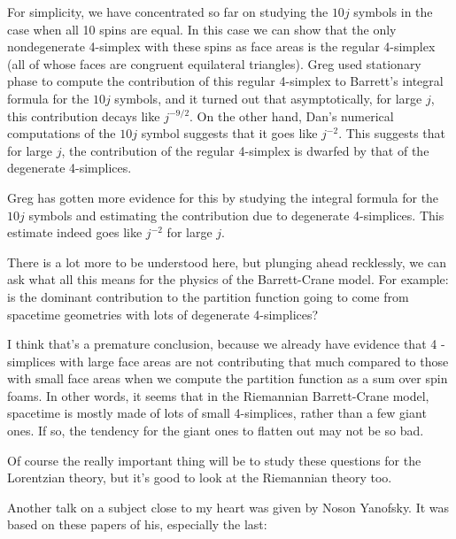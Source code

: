 \documentclass{article}
\renewcommand{\texttt}[1]{%
  \begingroup
  \ttfamily
  \begingroup\lccode`~=`/\lowercase{\endgroup\def~}{/\discretionary{}{}{}}%
  \begingroup\lccode`~=`[\lowercase{\endgroup\def~}{[\discretionary{}{}{}}%
  \begingroup\lccode`~=`.\lowercase{\endgroup\def~}{.\discretionary{}{}{}}%
  \catcode`/=\active\catcode`[=\active\catcode`.=\active
  \scantokens{#1\noexpand}%
  \endgroup
}
\begin{document}
For simplicity, we have concentrated so far on studying the \(10j\)
symbols in the case when all 10 spins are equal. In this case we can
show that the only nondegenerate 4-simplex with these spins as face
areas is the regular 4-simplex (all of whose faces are congruent
equilateral triangles). Greg used stationary phase to compute the
contribution of this regular 4-simplex to Barrett's integral formula for
the \(10j\) symbols, and it turned out that asymptotically, for large
\(j\), this contribution decays like \(j^{-9/2}\). On the other hand,
Dan's numerical computations of the \(10j\) symbol suggests that it goes
like \(j^{-2}\). This suggests that for large \(j\), the contribution of
the regular 4-simplex is dwarfed by that of the degenerate 4-simplices.

Greg has gotten more evidence for this by studying the integral formula
for the \(10j\) symbols and estimating the contribution due to
degenerate 4-simplices. This estimate indeed goes like \(j^{-2}\) for
large \(j\).

There is a lot more to be understood here, but plunging ahead
recklessly, we can ask what all this means for the physics of the
Barrett-Crane model. For example: is the dominant contribution to the
partition function going to come from spacetime geometries with lots of
degenerate 4-simplices?

I think that's a premature conclusion, because we already have evidence
that 4 -simplices with large face areas are not contributing that much
compared to those with small face areas when we compute the partition
function as a sum over spin foams. In other words, it seems that in the
Riemannian Barrett-Crane model, spacetime is mostly made of lots of
small 4-simplices, rather than a few giant ones. If so, the tendency for
the giant ones to flatten out may not be so bad.

Of course the really important thing will be to study these questions
for the Lorentzian theory, but it's good to look at the Riemannian
theory too.

Another talk on a subject close to my heart was given by Noson Yanofsky.
It was based on these papers of his, especially the last:

\end{document}
